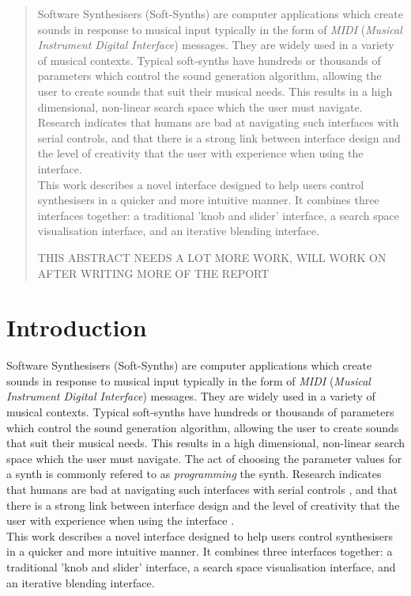\documentclass[11pt, oneside]{report}   	%
\begin{document}
\begin{abstract}
\begin{flushleft}
Software Synthesisers (Soft-Synths) are computer applications which create sounds in response to musical input typically in the form of \emph{MIDI} (\emph{Musical Instrument Digital Interface}) messages. They are widely used in a variety of musical contexts. Typical soft-synths have hundreds or thousands of parameters which control the sound generation algorithm, allowing the user to create sounds that suit their musical needs. This results in a high dimensional, non-linear search space which the user must navigate. Research indicates that humans are bad at navigating such interfaces with serial controls, and that there is a strong link between interface design and the level of creativity that the user with experience when using the interface. \\
This work describes a novel interface designed to help users control synthesisers in a quicker and more intuitive manner. It combines three interfaces together: a traditional 'knob and slider' interface, a search space visualisation interface, and an iterative blending interface.

THIS ABSTRACT NEEDS A LOT MORE WORK, WILL WORK ON AFTER WRITING MORE OF THE REPORT
\end{flushleft}
\end{abstract}


\tableofcontents
\clearpage
{}
\setcounter{page}{1}


\chapter{Introduction}
Software Synthesisers (Soft-Synths) are computer applications which create sounds in response to musical input typically in the form of \emph{MIDI} (\emph{Musical Instrument Digital Interface}) messages. They are widely used in a variety of musical contexts. Typical soft-synths have hundreds or thousands of parameters which control the sound generation algorithm, allowing the user to create sounds that suit their musical needs. This results in a high dimensional, non-linear search space which the user must navigate. The act of choosing the parameter values for a synth is commonly refered to as \emph{programming} the synth. Research indicates that humans are bad at navigating such interfaces with serial controls \cite{YeeKing}, and that there is a strong link between interface design and the level of creativity that the user with experience when using the interface \cite{TubbThesis}. \\
This work describes a novel interface designed to help users control synthesisers in a quicker and more intuitive manner. It combines three interfaces together: a traditional 'knob and slider' interface, a search space visualisation interface, and an iterative blending interface.
\end{document}
